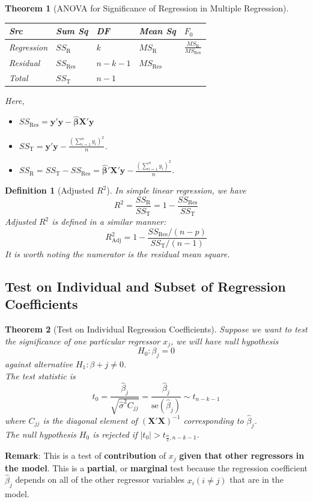 \documentclass[11pt]{article}
\newcommand{\se}{\mathrm{se}}
\newtheorem{definition}{Definition}[section]
\newtheorem{theorem}{Theorem}[section]
\theoremstyle{definition}
\begin{document}
\begin{theorem}[ANOVA for Significance of Regression in Multiple Regression]
\normalfont 
\begin{table}[h]
\centering
\begin{tabular}{|l|l|l|l|l|}
\hline
Src & Sum Sq & DF & Mean Sq & $F_0$\\\hline
Regression & $SS_\text{R}$ & $k$ & $MS_\text{R}$ & $\frac{MS_\text{R}}{MS_\text{Res}}$\\\hline
Residual & $SS_\text{Res}$ & $n-k-1$ & $MS_\text{Res}$ & \\\hline
Total & $SS_\text{T}$ & $n-1$ & & \\\hline
\end{tabular}
\end{table}
Here,
\begin{itemize}
  \item $SS_\text{Res}=\bm{y}'\bm{y} - \hat{\bm{\beta}}\bm{X}'\bm{y}$
  \item $SS_\text{T}=\bm{y}'\bm{y} - \frac{(\sum_{i=1}^n y_i)^2}{n}$.
  \item $SS_\text{R}=SS_\text{T}-SS_\text{Res}=\hat{\bm{\beta}}'\bm{X}'\bm{y}-\frac{(\sum_{i=1}^n y_i)^2}{n}$.
\end{itemize}
\end{theorem}
\begin{definition}[Adjusted {$R^2$}]
\normalfont In simple linear regression, we have
\[
R^2=\frac{SS_\text{R}}{SS_\text{T}}=1-\frac{SS_\text{Res}}{SS_\text{T}}
\]
Adjusted $R^2$ is defined in a similar manner:
\[
R_\text{Adj}^2= 1-\frac{SS_\text{Res}/(n-p)}{SS_\text{T}/(n-1)}
\]
It is worth noting the numerator is the residual mean square.
\end{definition}
\subsection{Test on Individual and Subset of Regression Coefficients}
\begin{theorem}[Test on Individual Regression Coefficients]
\normalfont Suppose we want to test the significance of one particular regressor $x_j$, we will have null hypothesis
\[
H_0:\beta_j=0
\]
against alternative $H_1:\beta+j\neq 0$.\\
The test statistic is
\[
t_0=\frac{\hat{\beta}_j}{\sqrt{\hat{\sigma}^2 C_{jj}}}=\frac{\hat{\beta}_j}{\se(\hat{\beta}_j)}\sim t_{n-k-1}
\]
where $C_{jj}$ is the diagonal element of $(\bm{X}'\bm{X})^{-1}$ corresponding to $\hat{\beta}_j$. \\
The null hypothesis $H_0$ is rejected if $|t_0|> t_{\frac{\alpha}{2}, n-k-1}$.
\end{theorem}
\textbf{Remark}: This is a test of \textbf{contribution} of $x_j$ \textbf{given that other regressors in the model}. This is a \textbf{partial}, or \textbf{marginal} test because the regression coefficient $\hat{\beta}_j$ depends on all of the other regressor variables $x_i(i\neq j)$ that are in the model.
\end{document}
